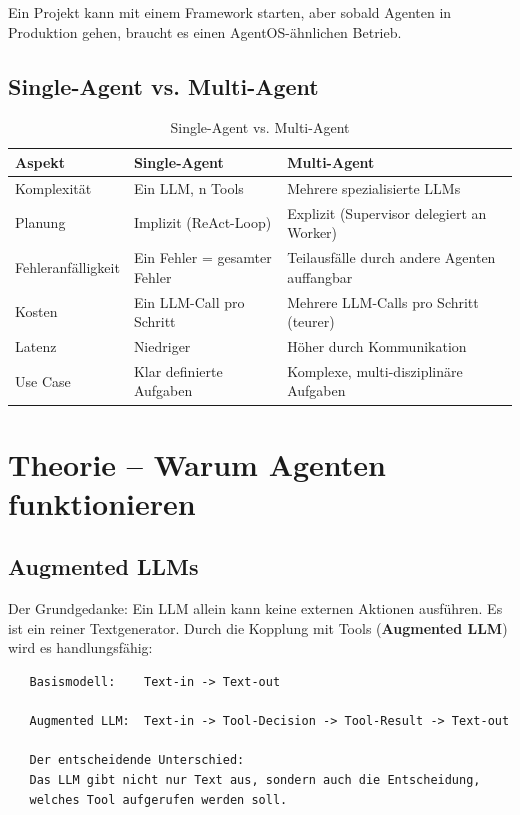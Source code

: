 Ein Projekt kann mit einem Framework starten, aber sobald Agenten in Produktion gehen, braucht es einen AgentOS-ähnlichen Betrieb.

\subsection{Single-Agent vs. Multi-Agent}

\begin{table}[H]
\centering
\begin{tabularx}{\linewidth}{lXX}
\toprule
\textbf{Aspekt} & \textbf{Single-Agent} & \textbf{Multi-Agent} \\
\midrule
Komplexität & Ein LLM, n Tools & Mehrere spezialisierte LLMs \\
Planung & Implizit (ReAct-Loop) & Explizit (Supervisor delegiert an Worker) \\
Fehleranfälligkeit & Ein Fehler = gesamter Fehler & Teilausfälle durch andere Agenten auffangbar \\
Kosten & Ein LLM-Call pro Schritt & Mehrere LLM-Calls pro Schritt (teurer) \\
Latenz & Niedriger & Höher durch Kommunikation \\
Use Case & Klar definierte Aufgaben & Komplexe, multi-disziplinäre Aufgaben \\
\midrule
\end{tabularx}
\caption{Single-Agent vs. Multi-Agent}
\label{tab:agent-types}
\end{table}

\section{Theorie -- Warum Agenten funktionieren}

\subsection{Augmented LLMs}

Der Grundgedanke: Ein LLM allein kann keine externen Aktionen ausführen. Es ist ein reiner Textgenerator. Durch die Kopplung mit Tools (\textbf{Augmented LLM}) wird es handlungsfähig:

\begin{verbatim}
   Basismodell:    Text-in -> Text-out

   Augmented LLM:  Text-in -> Tool-Decision -> Tool-Result -> Text-out

   Der entscheidende Unterschied:
   Das LLM gibt nicht nur Text aus, sondern auch die Entscheidung,
   welches Tool aufgerufen werden soll.
\end{verbatim}

